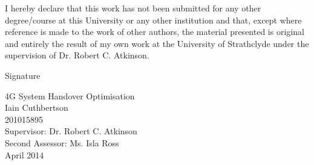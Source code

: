 \begin{titlepage}

I hereby declare that this work has not been submitted for any other degree/course at this University or any other institution and that, except where reference is made to the work of other authors, the material presented is original and entirely the result of my own work at the University of Strathclyde under the supervision of Dr. Robert C. Atkinson.

\vspace{1cm}
\begin{center}
Signature\hspace{0.5cm} \makebox[3.5in]{\hrulefill}
\end{center}

\vspace*{\fill}

\begin{center}
\Large {4G System Handover Optimisation}\\
\large {Iain Cuthbertson}\\
\large {201015895}\\
Supervisor: Dr. Robert C. Atkinson\\
Second Assessor: Ms. Isla Ross\\
April 2014
\end{center}


\vspace*{29mm}
\pagebreak

\end{titlepage}